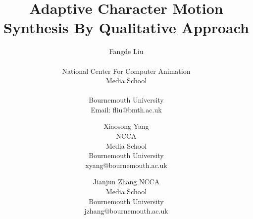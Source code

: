 \documentclass[a4paper]{article}
\newcommand{\titlesize}{\fontsize{16pt} \selectfont}
\begin{document}
%
\title{\titlesize \bf Adaptive Character Motion Synthesis By Qualitative Approach}

\author{
Fangde Liu\\
\\National Center For Computer Animation\\Media School\\
\\Bournemouth University\\
Email: fliu@bmth.ac.uk
\and
Xiaosong Yang\\
NCCA\\Media School\\
Bournemouth University\\
xyang@bournemouth.ac.uk
\and
Jianjun Zhang 
NCCA\\Media School\\
Bournemouth University\\
jzhang@bournemouth.ac.uk
}






\end{document}
